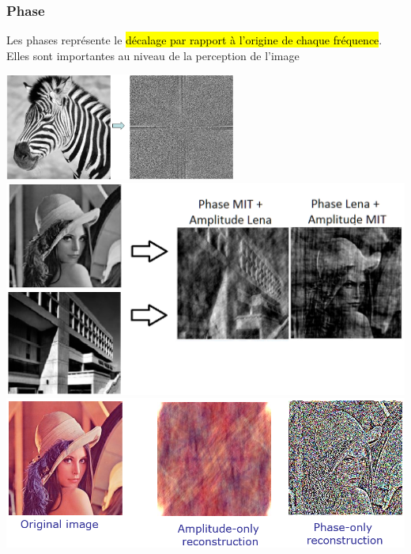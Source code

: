 \documentclass[letterpaper, 12pt]{article}
\newcommand{\alinea}{
\hspace*{0.5cm}}
\begin{document}
		\subsubsection{Phase}
			\alinea Les phases représente le \hl{décalage par rapport à l'origine de chaque fréquence}. Elles sont importantes au niveau
				de la perception de l'image				
			\begin{center}
				\includegraphics[width=3in]{Images/dft_phase}
				\includegraphics[width=5.5in]{Images/dft_phase2}
				\includegraphics[width=5.5in]{Images/dft_phase3}
			\end{center}
\end{document}

